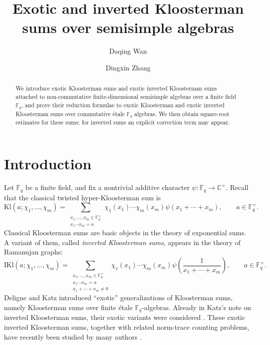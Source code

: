 \documentclass[11pt]{amsart}
\title{Exotic and inverted Kloosterman sums over semisimple algebras}
\author{Daqing Wan}
\author{Dingxin Zhang}
\newcommand{\Kl}{\mathrm{Kl}}
\newcommand{\IKl}{\mathrm{IKl}}
\numberwithin{equation}{section}
\theoremstyle{remark}
\theoremstyle{plain}
\theoremstyle{definition}
\begin{document}
\begin{abstract}
We introduce exotic Kloosterman sums and exotic inverted Kloosterman sums attached
to non-commutative finite-dimensional semisimple algebras over a finite field
\(\mathbb{F}_q\), and prove their reduction formulae to exotic
Kloosterman and exotic inverted Kloosterman sums over commutative étale \(\mathbb{F}_q\)
algebras. We then obtain square-root estimates for these sums; for
inverted sums an explicit correction term may appear.
\end{abstract}

\maketitle


\section{Introduction}

Let \(\mathbb{F}_q\) be a finite field, and fix a nontrivial additive
character \(\psi\colon\mathbb{F}_q\to\mathbb{C}^{\times}\).  Recall
that the classical twisted hyper-Kloosterman sum is
\[
\Kl(a;\chi_1,\ldots,\chi_m)
=
\sum_{\substack{x_1,\ldots,x_m\in\mathbb{F}_q^{\times}\\
    x_1\cdots x_m=a}}
\chi_1(x_1)\cdots\chi_m(x_m)\psi(x_1+\cdots+x_m),
\qquad a\in\mathbb{F}_q^\times.
\]
Classical Kloosterman sums are basic objects in the theory of exponential
sums.
A variant of them, called \emph{inverted Kloosterman sums}, appears in
the theory of Ramanujan graphs:
\begin{equation*}
\IKl(a; \chi_1,\ldots,\chi_m)
=
\sum_{\substack{x_1,\ldots,x_m\in\mathbb{F}_q^{\times}\\
    x_1\cdots x_m=a \\ x_1 + \cdots + x_m \neq 0}}
\chi_1(x_1)\cdots\chi_m(x_m)\psi\left( \frac{1}{x_1+\cdots+x_m} \right),
\qquad a\in\mathbb{F}_q^\times.
\end{equation*}
Deligne \cite{deligne_sommes-trig} and Katz
\cite{katz_gauss-sums-kloosterman-sums-and-monodromy} introduced
``exotic'' generalizations of Kloosterman sums, namely Kloosterman
sums over finite étale \(\mathbb{F}_q\)-algebras.  Already in Katz's
note on inverted Kloosterman sums, their exotic variants were
considered \cite{katz_note-exponential-sums}.  These exotic inverted
Kloosterman sums, together with related norm-trace counting problems,
have recently been studied by many authors
\cite{lin-wan_inverted-kloosterman,
  lin-wan_trace-norm-etale,fu-wan_exotic-inverted-kloosterman,
  wan_normtrace-kloosterman-sums-finite-semisimple-algebras}.
\end{document}
